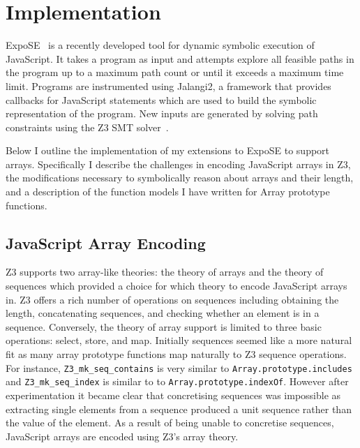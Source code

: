 \documentclass[]{final_report}
\begin{document}
\chapter{Implementation} \label{sec:implementation}

ExpoSE~\cite{DBLP:conf/spin/2017} is a recently developed tool for dynamic symbolic execution of JavaScript. It takes a program as input and attempts explore all feasible paths in the program up to a maximum path count or until it exceeds a maximum time limit. Programs are instrumented using Jalangi2, a framework that provides callbacks for JavaScript statements which are used to build the symbolic representation of the program. New inputs are generated by solving path constraints using the Z3 SMT solver~\cite{de2008z3}.

Below I outline the implementation of my extensions to ExpoSE to support arrays. Specifically I describe the challenges in encoding JavaScript arrays in Z3, the modifications necessary to symbolically reason about arrays and their length, and a description of the function models I have written for Array prototype functions.

\section{JavaScript Array Encoding}
Z3 supports two array-like theories: the theory of arrays and the theory of sequences which provided a choice for which theory to encode JavaScript arrays in. Z3 offers a rich number of operations on sequences including obtaining the length, concatenating sequences, and checking whether an element is in a sequence. Conversely, the theory of array support is limited to three basic operations: select, store, and map. Initially sequences seemed like a more natural fit as many array prototype functions map naturally to Z3 sequence operations. For instance, \lstinline|Z3_mk_seq_contains| is very similar to \lstinline|Array.prototype.includes| and \lstinline|Z3_mk_seq_index| is similar to to \lstinline|Array.prototype.indexOf|. However after experimentation it became clear that concretising sequences was impossible as extracting single elements from a sequence produced a unit sequence rather than the value of the element. As a result of being unable to concretise sequences, JavaScript arrays are encoded using Z3’s array theory. 
\end{document}
